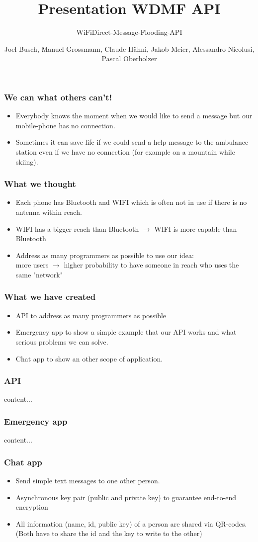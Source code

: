 \documentclass[11pt]{beamer}
\author{Joel Busch, Manuel Grossmann, Claude Hähni, Jakob Meier, Alessandro Nicolusi, Pascal Oberholzer}
\title{Presentation WDMF API}
\subtitle{WiFiDirect-Message-Flooding-API}
\institute{}
\date{}
\begin{document}
	\maketitle
	
	\begin{frame}
		\frametitle{We can what others can't!}
		\begin{itemize}
			\item Everybody knows the moment when we would like to send a message but our mobile-phone has no connection.
			\item Sometimes it can save life if we could send a help message to the ambulance station even if we have no connection (for example on a mountain while skiing).
		\end{itemize}
	\end{frame}
	
	\begin{frame}
		\frametitle{What we thought}
		\begin{itemize}
			\item Each phone has Bluetooth and WIFI which is often not in use if there is no antenna within reach.
			\item WIFI has a bigger reach than Bluetooth $ \rightarrow $ WIFI is more capable than Bluetooth
			\item Address as many programmers as possible to use our idea:\\
				more users $ \rightarrow $ higher probability to have someone in reach who uses the same "network"
		\end{itemize}
	\end{frame}
	
	\begin{frame}
		\frametitle{What we have created}
		\begin{itemize}
			\item API to address as many programmers as possible
			\item Emergency app to show a simple example that our API works and what serious problems we can solve.
			\item Chat app to show an other scope of application.
		\end{itemize}
	\end{frame}
	
	\begin{frame}
		\frametitle{API}
		content...
	\end{frame}
	
	\begin{frame}
		\frametitle{Emergency app}
		content...
	\end{frame}
	
	\begin{frame}
		\frametitle{Chat app}
		\begin{itemize}
			\item Send simple text messages to one other person.
			\item Asynchronous key pair (public and private key) to guarantee end-to-end encryption
			\item All information (name, id, public key) of a person are shared via QR-codes. (Both have to share the id and the key to write to the other)
		\end{itemize}
	\end{frame}
	
\end{document}
